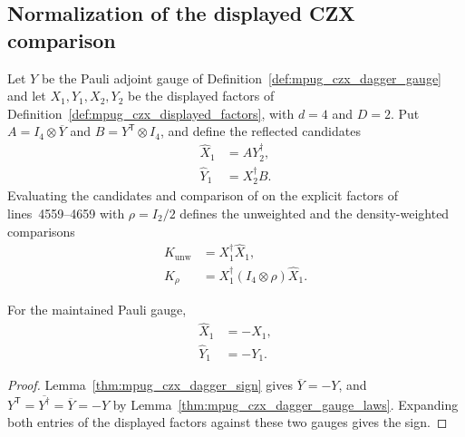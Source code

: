 \subsection{Normalization of the displayed CZX comparison}

\begin{definition}
    \label{def:mpug_czx_displayed_comparison}
    \leanok
    Let $Y$ be the Pauli adjoint gauge of
    Definition~\ref{def:mpug_czx_dagger_gauge} and let
    $X_1,Y_1,X_2,Y_2$ be the displayed factors of
    Definition~\ref{def:mpug_czx_displayed_factors}, with $d=4$ and $D=2$.
    Put $A=I_4\otimes\overline Y$ and $B=Y^{\mathsf T}\otimes I_4$, and
    define the reflected candidates
    \begin{align}
        \widehat X_1 & =AY_2^\dagger,  \\
        \widehat Y_1 & =X_2^\dagger B.
    \end{align}
    Evaluating the candidates and comparison of
    \cite[lines~5432--5441]{FrancoRubio2025MPUGauging} on the explicit
    factors of lines~4559--4659 with $\rho=I_2/2$ defines the unweighted
    and the density-weighted comparisons
    \begin{align}
        K_{\mathrm{unw}} & =X_1^\dagger\widehat X_1,                 \\
        K_\rho           & =X_1^\dagger(I_4\otimes\rho)\widehat X_1.
    \end{align}
\end{definition}

\begin{lemma}
    \label{thm:mpug_czx_reflected_neg}
    \leanok
    For the maintained Pauli gauge,
    \begin{align}
        \widehat X_1 & =-X_1, \\
        \widehat Y_1 & =-Y_1.
    \end{align}
\end{lemma}
\begin{proof}\leanok
    Lemma~\ref{thm:mpug_czx_dagger_sign} gives $\overline Y=-Y$, and
    $Y^{\mathsf T}=\overline{Y^\dagger}=\overline Y=-Y$ by
    Lemma~\ref{thm:mpug_czx_dagger_gauge_laws}. Expanding both entries
    of the displayed factors against these two gauges gives the sign.
\end{proof}

